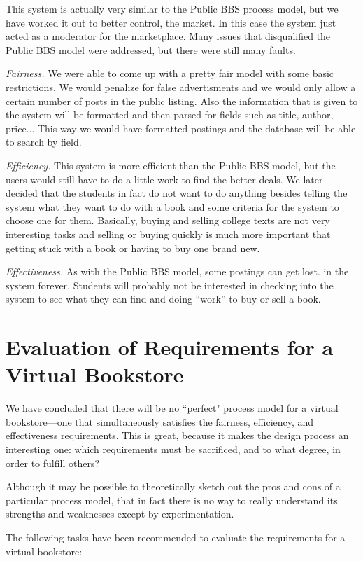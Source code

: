 This system is actually very similar to the Public BBS process model, but we
have worked it out to better control, the market.  In this case the system just
acted as a moderator for the marketplace.  Many issues that disqualified the
Public BBS model were addressed, but there were still many faults.

{\em Fairness.} We were able to come up with a pretty fair model with some
basic restrictions.  We would penalize for false advertisments and we would
only allow a certain number of posts in the public listing.  Also the
information that is given to the system will be formatted and then parsed for
fields such as title, author, price...  This way we would have formatted
postings and the database will be able to search by field.

{\em Efficiency.} This system is more efficient than the Public BBS model, but
the users would still have to do a little work to find the better deals.  We
later decided that the students in fact do not want to do anything besides
telling the system what they want to do with a book and some criteria for the
system to choose one for them.  Basically, buying and selling college texts are
not very interesting tasks and selling or buying quickly is much more important
that getting stuck with a book or having to buy one brand new.

{\em Effectiveness.}  As with the Public BBS model, some postings can get
lost. in the system forever.  Students will probably not be interested in
checking into the system to see what they can find and doing ``work'' to buy or
sell a book.

\section{Evaluation of Requirements for a Virtual Bookstore} 

We have concluded that there will be no ``perfect" process model for a
virtual bookstore---one that simultaneously satisfies the fairness,
efficiency, and effectiveness requirements.  This is great, because it
makes the design process an interesting one: which requirements must be
sacrificed, and to what degree, in order to fulfill others?  

Although it may be possible to theoretically
sketch out the pros and cons of a particular process model, that in fact
there is no way to really understand its strengths and weaknesses except by
experimentation. 

The following tasks have been recommended to evaluate the requirements for a
virtual bookstore:

